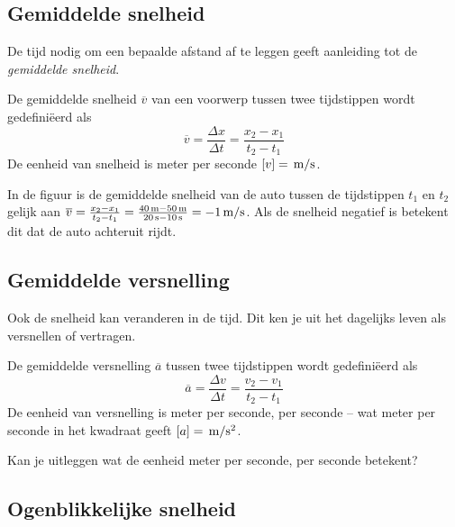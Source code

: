 \documentclass{ximera}
\begin{document}
\subsection{Gemiddelde snelheid}


De tijd nodig om een bepaalde afstand af te leggen geeft aanleiding tot de \textit{gemiddelde snelheid}. 


\begin{definition}
	
De gemiddelde snelheid $\overline{v}$ van een voorwerp tussen twee tijdstippen wordt gedefiniëerd als
\[
\overline{v}=\frac{\Delta x}{\Delta t}=\frac{x_2-x_1}{t_2-t_1}
\]
De eenheid van snelheid is meter per seconde $[v]=\rm\,m/s$. 
\end{definition}

In de figuur is de gemiddelde snelheid van de auto tussen de tijdstippen $t_1$ en $t_2$ gelijk aan $\overline{v}=\frac{x_2-x_1}{t_2-t_1}=\frac{40\rm\,m-50\rm\,m}{20\rm\,s-10\rm\,s}=-1\rm\,m/s$. Als de snelheid negatief is betekent dit dat de auto achteruit rijdt.



\subsection{Gemiddelde versnelling}

Ook de snelheid kan veranderen in de tijd. Dit ken je uit het dagelijks leven als versnellen of vertragen.

\begin{definition}

De gemiddelde versnelling \(\overline{a}\) tussen twee tijdstippen wordt gedefiniëerd als
\[
\overline{a}=\frac{\Delta v}{\Delta t}=\frac{v_2-v_1}{t_2-t_1}
\]
De eenheid van versnelling is meter per seconde, per seconde -- wat meter per seconde in het kwadraat geeft $[a]=\rm\,m/s^2$.
\end{definition}

\begin{denkvraag}
Kan je uitleggen wat de eenheid meter per seconde, per seconde betekent? 
\end{denkvraag}

\subsection{Ogenblikkelijke snelheid}
\end{document}
